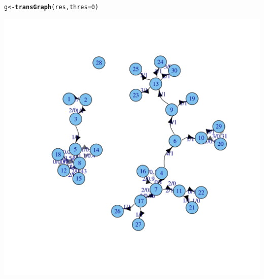 \documentclass{article}\usepackage[]{graphicx}\usepackage[]{color}
\makeatletter
\newcommand{\hlnum}[1]{\textcolor[rgb]{0.686,0.059,0.569}{#1}}%
\newcommand{\hlstd}[1]{\textcolor[rgb]{0.345,0.345,0.345}{#1}}%
\newcommand{\hlkwb}[1]{\textcolor[rgb]{0.69,0.353,0.396}{#1}}%
\newcommand{\hlkwc}[1]{\textcolor[rgb]{0.333,0.667,0.333}{#1}}%
\newcommand{\hlkwd}[1]{\textcolor[rgb]{0.737,0.353,0.396}{\textbf{#1}}}%
\newenvironment{kframe}{%
 \def\at@end@of@kframe{}%
 \ifinner\ifhmode%
  \def\at@end@of@kframe{\end{minipage}}%
  \begin{minipage}{\columnwidth}%
 \fi\fi%
 \def\FrameCommand##1{\hskip\@totalleftmargin \hskip-\fboxsep
 \colorbox{shadecolor}{##1}\hskip-\fboxsep
     \hskip-\linewidth \hskip-\@totalleftmargin \hskip\columnwidth}%
 \MakeFramed {\advance\hsize-\width
   \@totalleftmargin\z@ \linewidth\hsize
   \@setminipage}}%
 {\par\unskip\endMakeFramed%
 \at@end@of@kframe}
\newenvironment{knitrout}{}{} %
\makeatother
\begin{document}
\begin{knitrout}
\color{fgcolor}\begin{kframe}
\begin{alltt}
\hlstd{g} \hlkwb{<-} \hlkwd{transGraph}\hlstd{(res,} \hlkwc{thres}\hlstd{=}\hlnum{0}\hlstd{)}
\end{alltt}
\end{kframe}

{\centering \includegraphics[width=.6\textwidth]{figs/unnamed-chunk-20} 

}



\end{knitrout}
\end{document}
